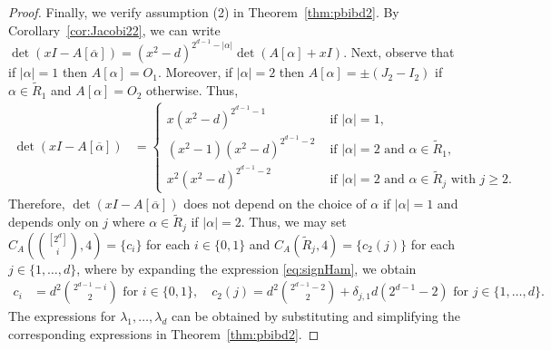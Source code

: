 \documentclass[11pt]{article}
\begin{document}
\begin{proof}
Finally, we verify assumption (2) in Theorem~\ref{thm:pbibd2}.  
By Corollary~\ref{cor:Jacobi22}, we can write $\det(xI-A[\overline \alpha]) = (x^2-d)^{2^{d-1}-|\alpha|}\det(A[\alpha]+xI)$.
Next, observe that if $|\alpha| = 1$ then $A[\alpha] = O_1$.
Moreover, if $|\alpha| = 2$ then $A[\alpha] = \pm(J_2 - I_2)$ if $\alpha \in \tilde R_1$ and $A[\alpha] = O_2$ otherwise.
Thus,
\begin{align}
\det(xI-A[\overline \alpha])
&=\begin{cases}
x(x^2-d)^{2^{d-1}-1}&\text{ if }|\alpha|=1,\\ 
(x^2-1)(x^2-d)^{2^{d-1}-2}&\text{ if }|\alpha|=2\text{ and }\alpha\in\tilde{R}_1,
\\ 
x^2(x^2-d)^{2^{d-1}-2}&\text{ if }|\alpha|=2\text{ and }\alpha\in\tilde{R}_j \text{ with } j\geqslant 2.
\end{cases}\label{eq:signHam}
\end{align}
Therefore, $\det(xI-A[\overline \alpha])$ does not depend on the choice of $\alpha$ if $|\alpha|=1$ and depends only on $j$ where $\alpha\in\tilde{R}_j$ if $|\alpha|=2$. 
Thus, we may set $C_A \left (\binom{[2^d]}{i},4 \right ) = \{c_i\}$ for each $i \in \{0,1\}$ and $C_A \left (\tilde{R}_j,4 \right ) = \{c_2(j)\}$ for each $j \in \{1,\ldots,d\}$, where 
by expanding the expression \eqref{eq:signHam},  we obtain
\begin{align*}
c_i&=d^2\binom{2^{d-1}-i}{2}\text{ 
for }i\in\{0,1\},\quad
c_2(j)=d^2\binom{2^{d-1}-2}{2}+\delta_{j,1}d(2^{d-1}-2)\text{ 
for }j\in\{1,\ldots,d\}. 
\end{align*}
The expressions for $\lambda_1,\dots,\lambda_d$ can be obtained by substituting and simplifying the corresponding expressions in Theorem~\ref{thm:pbibd2}.    %

\end{proof}
\end{document}
